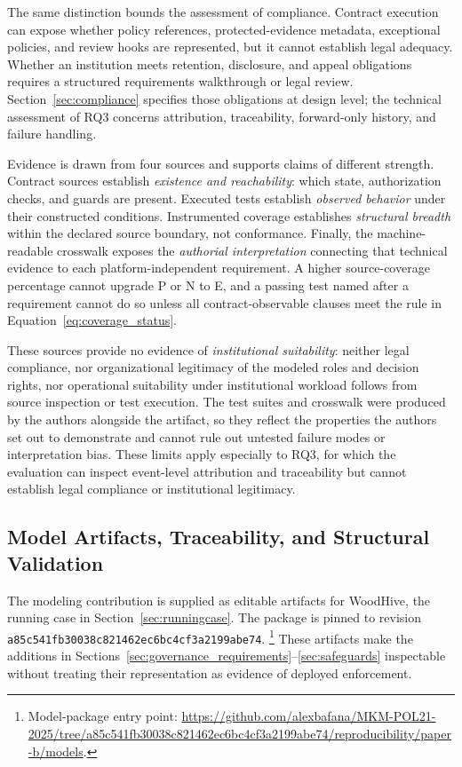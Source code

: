 \documentclass[journal]{IEEEtran}
\begin{document}
The same distinction bounds the assessment of compliance. Contract
execution can expose whether policy references, protected-evidence metadata,
exceptional policies, and review hooks are represented, but it cannot
establish legal adequacy. Whether an institution meets retention, disclosure,
and appeal obligations requires a structured requirements walkthrough or
legal review. Section~\ref{sec:compliance} specifies those obligations
at design level; the technical assessment of RQ3 concerns attribution,
traceability, forward-only history, and failure handling.

Evidence is drawn from four sources and supports claims of different
strength. Contract sources establish \emph{existence and reachability}: which
state, authorization checks, and guards are present. Executed tests establish
\emph{observed behavior} under their constructed conditions. Instrumented
coverage establishes \emph{structural breadth} within the declared source
boundary, not conformance. Finally, the machine-readable crosswalk exposes the
\emph{authorial interpretation} connecting that technical evidence to each
platform-independent requirement. A higher source-coverage percentage cannot
upgrade P or N to E, and a passing test named after a requirement cannot do so
unless all contract-observable clauses meet the rule in
Equation~\ref{eq:coverage_status}.

These sources provide no evidence of \emph{institutional suitability}:
neither legal compliance, nor organizational legitimacy of the modeled roles
and decision rights, nor operational suitability under institutional workload
follows from source inspection or test execution. The test suites and
crosswalk were produced by the authors alongside the artifact, so they reflect
the properties the authors set out to demonstrate and cannot rule out untested
failure modes or interpretation bias. These limits apply especially to RQ3,
for which the evaluation can inspect event-level attribution and traceability
but cannot establish legal compliance or institutional legitimacy.

\subsection{Model Artifacts, Traceability, and Structural Validation}
\label{sec:model_artifact_validation}

The modeling contribution is supplied as editable artifacts for
WoodHive, the running case in Section~\ref{sec:runningcase}.
The package is pinned to revision
\texttt{a85c541fb30038c821462ec6bc4cf3a2199abe74}.
\footnote{Model-package entry point:
\url{https://github.com/alexbafana/MKM-POL21-2025/tree/a85c541fb30038c821462ec6bc4cf3a2199abe74/reproducibility/paper-b/models}.}
These artifacts make the additions in
Sections~\ref{sec:governance_requirements}--\ref{sec:safeguards}
inspectable without treating their representation as evidence
of deployed enforcement.
\end{document}
